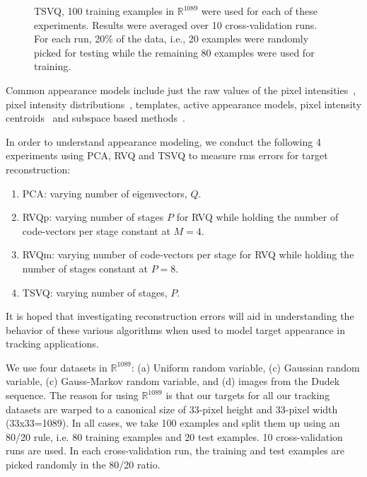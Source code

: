 \begin{figure}[t]
\caption{TSVQ, 100 training examples in $\mathbb{R}^{1089}$ were used for each of these experiments. Results were averaged over 10 cross-validation runs. For each run, 20\% of the data, i.e., 20 examples were randomly picked for testing while the remaining 80 examples were used for training.}
\label{fig:TSVQ_results}
\end{figure}

Common appearance models include just the raw values of the pixel intensities~\cite{2000_CNF_TRK_Mallet, 1981_JNL_OpticalFlow_HornSchunck}, pixel intensity distributions~\cite{2002_JNL_MeanShiftFeatureSpaceAnalysis_Comaniciu, 1996_JNL_TRK_Zhu, 2002_JNL_TRK_Paragios, 2002_JNL_TRK_Elgammal}, templates\cite{1997_CNF_TRK_Fieguth}, active appearance models\cite{1998_CNF_ActiveModels_Edwards, 1995_JNL_ActiveModels_Cootes}, pixel intensity centroids~\cite{1997_CNF_TRK_Heisele} and subspace based methods~\cite{1997_JNL_EigenTRK_Moghaddam, 1998_JNL_Eigentracking_Black}.  

In order to understand appearance modeling, we conduct the following 4 experiments using PCA, RVQ and TSVQ to measure rms errors for target reconstruction:

\begin{enumerate}
\item PCA: varying number of eigenvectors, $Q$.
\item RVQp: varying number of stages $P$ for RVQ while holding the number of code-vectors per stage constant at $M=4$.
\item RVQm: varying number of code-vectors per stage for RVQ while holding the number of stages constant at $P=8$.
\item TSVQ: varying number of stages, $P$.
\end{enumerate}

It is hoped that investigating reconstruction errors will aid in understanding the behavior of these various algorithms when used to model target appearance in tracking applications.

We use four datasets in $\mathbb{R}^{1089}$: (a) Uniform random variable, (c) Gaussian random variable, (c) Gauss-Markov random variable, and (d) images from the Dudek sequence. The reason for using $\mathbb{R}^{1089}$ is that our targets for all our tracking datasets are warped to a canonical size of 33-pixel height and 33-pixel width (33x33=1089). In all cases, we take 100 examples and split them up using an 80/20 rule, i.e. 80 training examples and 20 test examples. 10 cross-validation runs are used. In each cross-validation run, the training and test examples are picked randomly in the 80/20 ratio.

